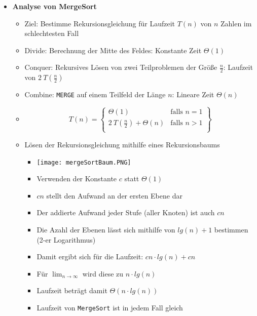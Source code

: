 \begin{itemize}
        \item \textbf{Analyse von MergeSort} 
            \begin{itemize}
                \item Ziel: Bestimme Rekursionsgleichung für Laufzeit $T(n)$ von $n$ Zahlen im schlechtesten Fall
                \item Divide: Berechnung der Mitte des Feldes: Konstante Zeit $\Theta(1)$
                \item Conquer: Rekursives Lösen von zwei Teilproblemen der Größe $\frac{n}{2}$: Laufzeit von $2~T(\frac{n}{2})$
                \item Combine: \texttt{MERGE} auf einem Teilfeld der Länge $n$: Lineare Zeit $\Theta(n)$
                \item[] \[
                        T(n) = \left.
                            \begin{cases}
                                \Theta(1) & \text{falls } n = 1 \\
                                2~T(\frac{n}{2}) + \Theta(n) & \text{falls } n > 1 \\
                            \end{cases}
                            \right \}
                        \]
                \item Lösen der Rekursionsgleichung mithilfe eines Rekursionsbaums
                    \begin{itemize}
                        \item[] \texttt{[image: mergeSortBaum.PNG]}
                        \item Verwenden der Konstante $c$ statt $\Theta(1)$
                        \item $cn$ stellt den Aufwand an der ersten Ebene dar 
                        \item Der addierte Aufwand jeder Stufe (aller Knoten) ist auch $cn$
                        \item Die Azahl der Ebenen lässt sich mithilfe von $lg(n) + 1$ bestimmen (2-er Logarithmus)
                        \item Damit ergibt sich für die Laufzeit: $cn \cdot lg(n)+cn$
                        \item Für $\lim_{n \rightarrow \infty}$ wird diese zu $n \cdot lg(n)$
                        \item Laufzeit beträgt damit $\Theta(n \cdot lg(n))$
                        \item Laufzeit von \texttt{MergeSort} ist in jedem Fall gleich
                    \end{itemize}
                
            \end{itemize}
    \end{itemize}



